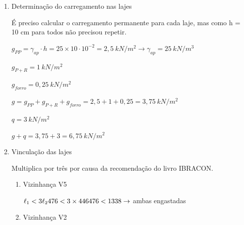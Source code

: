 


\begin{resposta}
    \begin{enumerate}[start=2]
        \item Determinação do carregamento nas lajes

        \begin{observacao}
            É preciso calcular o carregamento permanente para cada laje, mas como h = 10 cm para todos não precisou repetir.
        \end{observacao}

        

        $g_{PP} = \gamma_{ap} \cdot h = 25 \times 10 \cdot 10^{-2} = 2,5 \ kN/m^2 \to \gamma_{ap}=25 \ kN/m^3$ \cite[tabela 1]{nbr6120}

        $g_{P+R} = 1 \ kN/m^2$ \cite[tabela 4]{nbr6120}

        $g_{forro}= 0,25 \ kN/m^2$ \cite[tabela 8]{nbr6120} \newline

        $g= g_{PP}+g_{P+R}+g_{forro} = 2,5+1+0,25=3,75 \ kN/m^2$

        $q= 3 \ kN/m^2$ \cite[tabela 10]{nbr6120} \newline

        $g+q=3,75+3=6,75\ kN/m^2$ \newline

        \item Vinculação das lajes

        \begin{observacao}
            Multiplica por três por causa da recomendação do livro IBRACON.
        \end{observacao}


            \begin{enumerate}
                \item Vizinhança V5

                
    
                $\ell_1 < 3\ell_2 \newline 476 < 3 \times 446 \newline 476 < 1338 \to$ ambas engastadas
                
                \item Vizinhança V2


\end{enumerate}
\end{enumerate}
\end{resposta}
